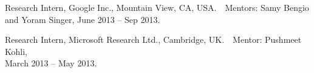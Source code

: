 \documentclass[10pt,letterpaper]{article}
\renewenvironment{itemize}{
  \begin{list}{}{
    \setlength{\leftmargin}{1.5em}
  }
}{
  \end{list}
}
\begin{document}
\begin{itemize}

\item Research Intern, Google Inc., Mountain View, CA, USA.~~Mentors:
  Samy Bengio and Yoram Singer,  June 2013 -- Sep 2013.

\item Research Intern, Microsoft Research Ltd., Cambridge, UK.~~Mentor:
  Pushmeet Kohli,\\ March 2013 -- May 2013.







\end{itemize}
\end{document}
